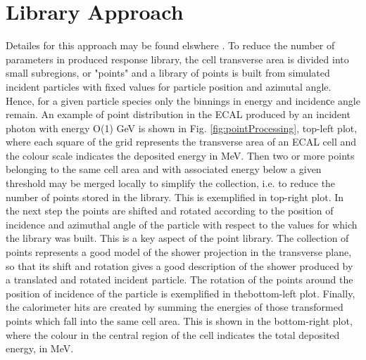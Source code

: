 \documentclass{PoS}
\begin{document}
\section{Library Approach \label{seq:LA}}
Detailes for this approach may be found elswhere \cite{chepFastSim}.
To reduce the number of parameters in produced response library, the
cell transverse area is divided into small subregions, or "points" and
a library of points is built from simulated incident particles with
fixed values for particle position and azimutal angle. Hence, for a
given particle species only the binnings in energy and incidenсe angle remain. An example of point distribution in the ECAL produced by an incident photon with energy O(1) GeV is shown in Fig. \ref{fig:pointProcessing}, top-left plot, where each square of the grid represents the transverse area of an ECAL cell and the colour scale indicates the deposited energy in MeV.
Then two or more points belonging to the same cell area and with
associated energy below a given threshold may be merged locally to
simplify the collection, i.e. to reduce the number of points stored in
the library. This is exemplified in top-right plot. In the next step
the points are shifted and rotated according to the position of
incidence and azimuthal angle of the particle with respect to the
values for which the library was built. This is a key aspect of the
point library. The collection of points represents a good model of the
shower projection in the transverse plane, so that its shift and
rotation gives a good description of the shower produced by a
translated and rotated incident particle. The rotation of the points
around the position of incidence of the particle is exemplified in
thebottom-left plot. Finally, the calorimeter hits are created by
summing the energies of those transformed points which fall into the
same cell area. This is shown in the bottom-right plot, where the
colour in the central region of the cell indicates the total deposited
energy, in MeV.
\end{document}
